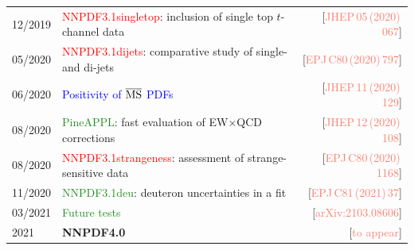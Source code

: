 \documentclass{beamer}
\begin{document}
\begin{frame}
\begin{tabularx}{\textwidth}{lXr}
  12/2019 & \textcolor{red}{NNPDF3.1singletop}: {\scriptsize inclusion of single top $t$-channel data}                                          
          & {\tiny{[{\textcolor{salmon}{JHEP\,05\,(2020)\,067}}]}}\\
  05/2020 & \textcolor{red}{NNPDF3.1dijets}: {\scriptsize comparative study of single- and di-jets}                                             
          & {\tiny{[{\textcolor{salmon}{EPJ\,C80\,(2020)\,797}}]}}\\
  06/2020 & \textcolor{blue}{Positivity of $\overline{\rm MS}$ PDFs}                    
          & {\tiny{[{\textcolor{salmon}{JHEP\,11\,(2020)\,129}}]}}\\
  08/2020 & \textcolor{forestgreen}{PineAPPL}: {\scriptsize fast evaluation of EW$\times$QCD corrections}                                           
          & {\tiny{[{\textcolor{salmon}{JHEP\,12\,(2020)\,108}}]}}\\
  08/2020 & \textcolor{red}{NNPDF3.1strangeness}: {\scriptsize assessment of strange-sensitive data}                                        
          & {\tiny{[{\textcolor{salmon}{EPJ\,C80\,(2020)\,1168}}]}}\\
  11/2020 & \textcolor{forestgreen}{NNPDF3.1deu}: {\scriptsize deuteron uncertainties in a fit}                                        
          & {\tiny{[{\textcolor{salmon}{EPJ\,C81\,(2021)\,37}}]}}\\
  03/2021 & \textcolor{forestgreen}{Future tests}                                       
          & {\tiny{[{\textcolor{salmon}{arXiv:2103.08606}}]}}\\
  2021    & {\bf NNPDF4.0}                                                              
          & {\tiny{[{\textcolor{salmon}{to appear}}]}}\\
 \end{tabularx}
\end{frame}
\end{document}
